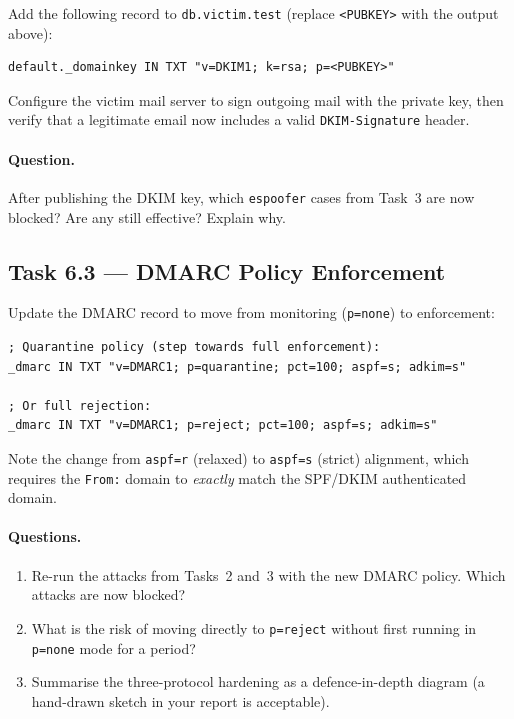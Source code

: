 \documentclass[11pt]{article}
\begin{document}
Add the following record to \texttt{db.victim.test}
(replace \texttt{<PUBKEY>} with the output above):

\begin{listing}[H]
\begin{verbatim}
default._domainkey IN TXT "v=DKIM1; k=rsa; p=<PUBKEY>"
\end{verbatim}
\end{listing}

Configure the victim mail server to sign outgoing mail with the private
key, then verify that a legitimate email now includes a valid
\texttt{DKIM-Signature} header.

\paragraph{Question.}
After publishing the DKIM key, which \texttt{espoofer} cases from
Task~3 are now blocked?
Are any still effective? Explain why.

\subsection{Task 6.3 --- DMARC Policy Enforcement}

Update the DMARC record to move from monitoring (\texttt{p=none}) to
enforcement:

\begin{listing}[H]
\begin{verbatim}
; Quarantine policy (step towards full enforcement):
_dmarc IN TXT "v=DMARC1; p=quarantine; pct=100; aspf=s; adkim=s"

; Or full rejection:
_dmarc IN TXT "v=DMARC1; p=reject; pct=100; aspf=s; adkim=s"
\end{verbatim}
\end{listing}

Note the change from \texttt{aspf=r} (relaxed) to \texttt{aspf=s}
(strict) alignment, which requires the \texttt{From:} domain to
\emph{exactly} match the SPF/DKIM authenticated domain.

\paragraph{Questions.}
\begin{enumerate}[noitemsep]
  \item Re-run the attacks from Tasks~2 and~3 with the new DMARC
    policy. Which attacks are now blocked?
  \item What is the risk of moving directly to \texttt{p=reject}
    without first running in \texttt{p=none} mode for a period?
  \item Summarise the three-protocol hardening as a defence-in-depth
    diagram (a hand-drawn sketch in your report is acceptable).
\end{enumerate}
\end{document}
